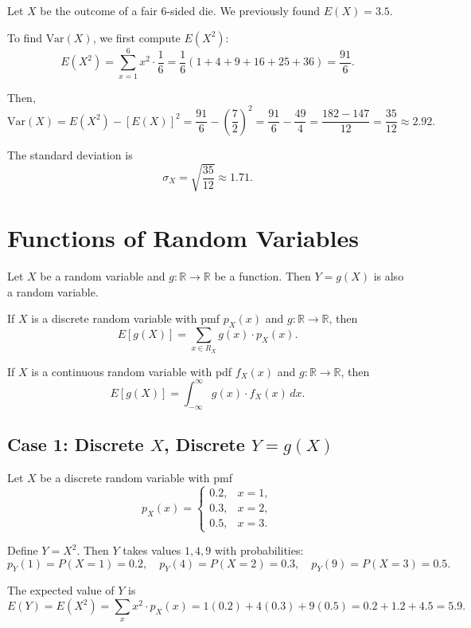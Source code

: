 \begin{eg}
Let \(X\) be the outcome of a fair 6-sided die. We previously found \(E(X) = 3.5\).

To find \(\text{Var}(X)\), we first compute \(E(X^2)\):
\[
E(X^2) = \sum_{x=1}^{6} x^2 \cdot \frac{1}{6} = \frac{1}{6}(1 + 4 + 9 + 16 + 25 + 36) = \frac{91}{6}.
\]

Then,
\[
\text{Var}(X) = E(X^2) - [E(X)]^2 = \frac{91}{6} - \left(\frac{7}{2}\right)^2 = \frac{91}{6} - \frac{49}{4} = \frac{182 - 147}{12} = \frac{35}{12} \approx 2.92.
\]

The standard deviation is
\[
\sigma_X = \sqrt{\frac{35}{12}} \approx 1.71.
\]
\end{eg}


\section{Functions of Random Variables}

\begin{definition}
Let \(X\) be a random variable and \(g : \mathbb{R} \to \mathbb{R}\) be a function. Then \(Y = g(X)\) is also a random variable.
\end{definition}

\begin{theorem}
If \(X\) is a discrete random variable with pmf \(p_X(x)\) and \(g : \mathbb{R} \to \mathbb{R}\), then
\[
E[g(X)] = \sum_{x \in R_X} g(x) \cdot p_X(x).
\]
\end{theorem}

\begin{theorem}
If \(X\) is a continuous random variable with pdf \(f_X(x)\) and \(g : \mathbb{R} \to \mathbb{R}\), then
\[
E[g(X)] = \int_{-\infty}^{\infty} g(x) \cdot f_X(x) \, dx.
\]
\end{theorem}

\subsection{Case 1: Discrete \texorpdfstring{\(X\)}{X}, Discrete \texorpdfstring{\(Y = g(X)\)}{Y = g(X)}}

\begin{eg}
Let \(X\) be a discrete random variable with pmf
\[
p_X(x) = \begin{cases}
0.2, & x = 1, \\
0.3, & x = 2, \\
0.5, & x = 3.
\end{cases}
\]

Define \(Y = X^2\). Then \(Y\) takes values \(1, 4, 9\) with probabilities:
\[
p_Y(1) = P(X = 1) = 0.2, \quad p_Y(4) = P(X = 2) = 0.3, \quad p_Y(9) = P(X = 3) = 0.5.
\]

The expected value of \(Y\) is
\[
E(Y) = E(X^2) = \sum_{x} x^2 \cdot p_X(x) = 1(0.2) + 4(0.3) + 9(0.5) = 0.2 + 1.2 + 4.5 = 5.9.
\]
\end{eg}

